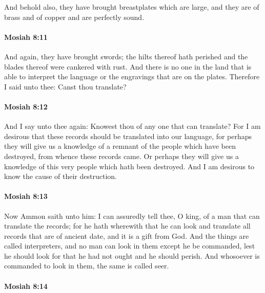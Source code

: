 			And behold also, they have brought breastplates which are large,
			and they are of brass and of copper and are perfectly sound.

		\paragraph{Mosiah 8:11} %
			\label{MOSIAH-8-11}

			And again, they have brought swords;
			the hilts thereof hath perished
			and the blades thereof were cankered with rust.
			And there is no one in the land that is able to interpret the language
			or the engravings that are on the plates.
			Therefore I said unto thee:
			Canst thou translate?

		\paragraph{Mosiah 8:12} %
			\label{MOSIAH-8-12}

			And I say unto thee again:
			Knowest thou of any one that can translate?
			For I am desirous that these records should be translated into our language,
			for perhaps they will give us a knowledge of a remnant of the people
			which have been destroyed,
			from whence these records came.
			Or perhaps they will give us a knowledge of this very people
			which hath been destroyed.
			And I am desirous to know the cause of their destruction.

		\paragraph{Mosiah 8:13} %
			\label{MOSIAH-8-13}

			Now Ammon saith unto him:
			I can assuredly tell thee, O king, of a man that can translate the records;
			for he hath wherewith that he can look
			and translate all records that are of ancient date,
			and it is a gift from God.
			And the things are called interpreters,
			and no man can look in them except he be commanded,
			lest he should look for that he had not ought and he should perish.
			And whosoever is commanded to look in them, the same is called seer.

		\paragraph{Mosiah 8:14} %
			\label{MOSIAH-8-14}

